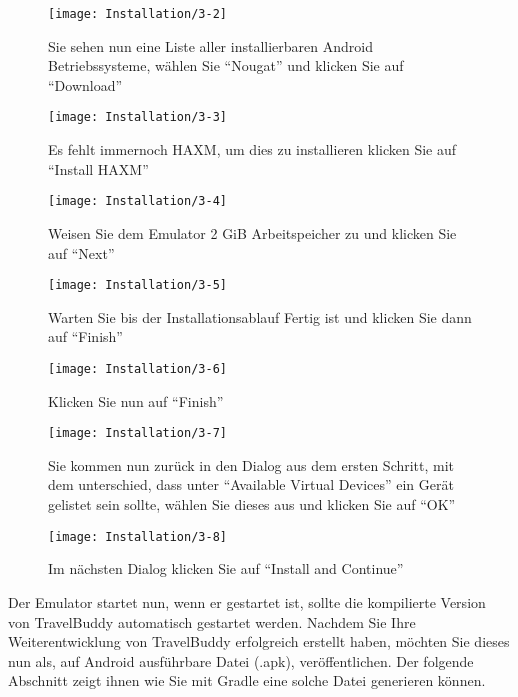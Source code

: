\begin{figure}
  \centering
  \texttt{[image: Installation/3-2]}
  \caption{Sie sehen nun eine Liste aller installierbaren Android Betriebssysteme, wählen Sie ``Nougat'' und klicken Sie auf ``Download''}
\end{figure}

\begin{figure}
  \centering
  \texttt{[image: Installation/3-3]}
  \caption{Es fehlt immernoch HAXM, um dies zu installieren klicken Sie auf ``Install HAXM'' }
\end{figure}

\begin{figure}
  \centering
  \texttt{[image: Installation/3-4]}
  \caption{Weisen Sie dem Emulator 2 GiB Arbeitspeicher zu und klicken Sie auf ``Next''}
\end{figure}

\begin{figure}
  \centering
  \texttt{[image: Installation/3-5]}
  \caption{Warten Sie bis der Installationsablauf Fertig ist und klicken Sie dann auf ``Finish''}
\end{figure}

\begin{figure}
  \centering
  \texttt{[image: Installation/3-6]}
  \caption{Klicken Sie nun auf ``Finish''}
\end{figure}

\begin{figure}
  \centering
  \texttt{[image: Installation/3-7]}
  \caption{Sie kommen nun zurück in den Dialog aus dem ersten Schritt, mit dem unterschied, dass unter ``Available Virtual Devices'' ein Gerät gelistet sein sollte, wählen Sie dieses aus und klicken Sie auf ``OK''}
\end{figure}

\begin{figure}
  \centering
  \texttt{[image: Installation/3-8]}
  \caption{Im nächsten Dialog klicken Sie auf ``Install and Continue''}
\end{figure}

Der Emulator startet nun, wenn er gestartet ist, sollte die kompilierte Version von TravelBuddy automatisch gestartet werden.
Nachdem Sie Ihre Weiterentwicklung von TravelBuddy erfolgreich erstellt haben, möchten Sie dieses nun als, auf Android ausführbare Datei (.apk), veröffentlichen.
Der folgende Abschnitt zeigt ihnen wie Sie mit Gradle eine solche Datei generieren können.

